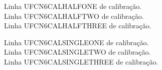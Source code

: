 \documentclass{abntexto-ufc}
\begin{document}
\pretextual


\clearpage
\thispagestyle{empty}

\begingroup
\onehalfsp
Linha UFCN6CALHALFONE de calibração.\\
Linha UFCN6CALHALFTWO de calibração.\\
Linha UFCN6CALHALFTHREE de calibração.
\par
\endgroup

\vspace{3\baselineskip}

\begingroup
\fontsize{10}{12}\selectfont
\singlesp
Linha UFCN6CALSINGLEONE de calibração.\\
Linha UFCN6CALSINGLETWO de calibração.\\
Linha UFCN6CALSINGLETHREE de calibração.
\par
\endgroup
\end{document}

